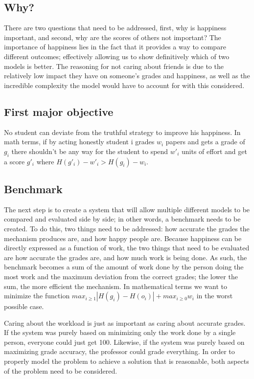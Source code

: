 \documentclass[12pt, Arial]{article}
\begin{document}
\subsection{Why?}
There are two questions that need to be addressed, first, why is happiness important, and second, why are the scores of others not important? The importance of happiness lies in the fact that it provides a way to compare different outcomes; effectively allowing us to show definitively which of two models is better. The reasoning for not caring about friends is due to the relatively low impact they have on someone's grades and happiness, as well as the incredible complexity the model would have to account for with this considered.
\subsection{First major objective}
No student can deviate from the truthful strategy to improve his happiness. In math terms, if by acting honestly student i grades $w_i$ papers and gets a grade of $g_i$ there shouldn't be any way for the student to spend $w'_i$ units of effort and get a score $g'_i$ where $H(g'_i)-w'_i > H(g_i)-w_i$.

\subsection{Benchmark}
The next step is to create a system that will allow multiple different models to be compared and evaluated side by side; in other words, a benchmark needs to be created. To do this, two things need to be addressed: how accurate the grades the mechanism produces are, and how happy people are. Because happiness can be directly expressed as a function of work, the two things that need to be evaluated are how accurate the grades are, and how much work is being done. As such, the benchmark becomes a sum of the amount of work done by the person doing the most work and the maximum deviation from the correct grades; the lower the sum, the more efficient the mechanism. In mathematical terms we want to minimize the function $max_{i \ge 1} |H(g_i)-H(o_i)| + max_{i \ge 0} w_i$ in the worst possible case.

Caring about the workload is just as important as caring about accurate grades. If the system was purely based on minimizing only the work done by a single person, everyone could just get 100. Likewise, if the system was purely based on maximizing grade accuracy, the professor could grade everything. In order to properly model the problem to achieve a solution that is reasonable, both aspects of the problem need to be considered.
\end{document}
